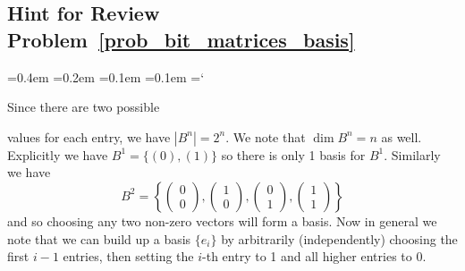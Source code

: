 
\subsection*{Hint for Review Problem~\ref{prob_bit_matrices_basis}}

{\ttfamily
{}\font=0.4em
\font=0.2em
\font=0.1em
\font=0.1em
\hyphenchar\font=`\-


\hypertarget{scripts_basis_and_dimension_hint}{Since there are two possible} values for each entry, we have $|B^n| = 2^n$. We note that $\dim B^n = n$ as well. Explicitly we have $B^1 = \{ (0), (1) \}$ so there is only 1 basis for $B^1$. Similarly we have
\[
B^2 = \left\{
\begin{pmatrix} 0 \\ 0 \end{pmatrix},
\begin{pmatrix} 1 \\ 0 \end{pmatrix},
\begin{pmatrix} 0 \\ 1 \end{pmatrix},
\begin{pmatrix} 1 \\ 1 \end{pmatrix}
\right\}
\]
and so choosing any two non-zero vectors will form a basis. Now in general we note that we can build up a basis $\{ e_i \}$ by arbitrarily (independently) choosing the first $i-1$ entries, then setting the $i$-th entry to 1 and all higher entries to 0.

} %

